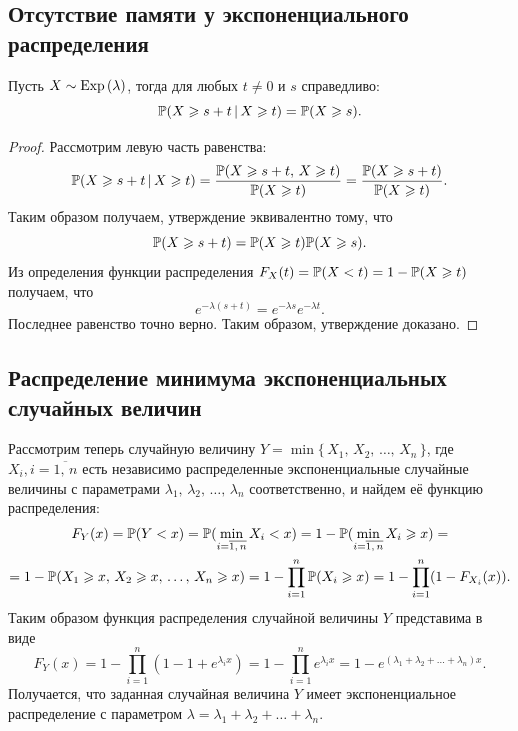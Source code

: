 \subsection{Отсутствие памяти у экспоненциального распределения}

\begin{assertion}
        Пусть $X\sim\mbox{Exp\,}(\lambda)$, тогда для любых $t \neq 0$ и $s$ справедливо:
$$
        \mathbb{P}(X\geqslant s+t\,|\,X\geqslant t) =
        \mathbb{P}(X \geqslant s).
$$
\end{assertion}

\begin{proof}
        Рассмотрим левую часть равенства:
$$
        \mathbb{P}(X \geqslant s + t\,|\,X\geqslant t) =
        \frac{\mathbb{P}(X \geqslant s + t,\,X\geqslant t)}{\mathbb{P}(X\geqslant t)} =
        \frac{\mathbb{P}(X \geqslant s + t)}{\mathbb{P}(X\geqslant t)}.
$$
Таким образом получаем, утверждение эквивалентно тому, что
$$
        \mathbb{P}(X\geqslant s+t) = 
        \mathbb{P}(X\geqslant t)\mathbb{P}(X\geqslant s).
$$
Из определения функции распределения $F_X(t) = \mathbb{P}(X < t) = 1 - \mathbb{P}(X \geqslant t)$ получаем, что
$$
        e^{-\lambda(s+t)} = e^{-\lambda s}e^{-\lambda t}.
$$
Последнее равенство точно верно. Таким образом, утверждение доказано.
\end{proof}


\subsection{Распределение минимума экспоненциальных случайных величин}

Рассмотрим теперь случайную величину $Y = \min\{\,X_1,\,X_2,\,\ldots,\,X_n\,\}$, где $X_i, i = \overline{1,\,n}$ есть независимо распределенные экспоненциальные случайные величины с параметрами $\lambda_1,\,\lambda_2,\,\ldots,\,\lambda_n$ соответственно, и найдем её функцию распределения:
\begin{multline*}
        F_Y(x) =
        \mathbb{P}(Y < x) = 
        \mathbb{P} (\min\limits_{i = \overline{1,\,n}} X_i < x) =
        1 - \mathbb{P} (\min\limits_{i = \overline{1,\,n}} X_i \geqslant x) =
        \\
        = 1 - \mathbb{P}(X_1 \geqslant x,\,X_2 \geqslant x,\,\ldots,\,X_n \geqslant x) =
        1 - \prod_{i = 1}^{n} \mathbb{P} (X_i \geqslant x) = 
        1 - \prod_{i = 1}^n(1 - F_{X_i}(x)).
\end{multline*}
Таким образом функция распределения случайной величины $Y$ представима в виде
$$
        F_Y(x) = 1 - \prod_{i = 1}^n (1 - 1 + e^{\lambda_i x}) =
        1 - \prod_{i = 1}^n e^{\lambda_i x} = 1 - e^{(\lambda_1 + \lambda_2 + \ldots + \lambda_n)x}.
$$
Получается, что заданная случайная величина $Y$ имеет экспоненциальное распределение с параметром $\lambda = \lambda_1 + \lambda_2 + \ldots + \lambda_n$.


